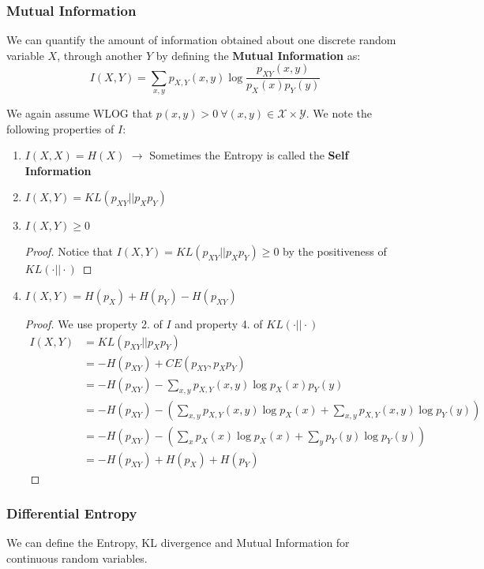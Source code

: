 \documentclass[]{article}
\theoremstyle{mattstyle}
\theoremstyle{definition}
\begin{document}
\subsubsection{Mutual Information}
We can quantify the amount of information obtained about one discrete random variable $X$, through another $Y$ by defining the \textbf{Mutual Information} as:
\begin{equation}
I(X,Y)=\sum_{x,y}p_{X,Y}(x,y)\log\frac{p_{XY}(x,y)}{p_X(x)p_Y(y)}
\end{equation}

We again assume WLOG that \(p(x,y)>0 \ \forall (x,y)\in\mathcal{X}\times\mathcal{Y}\). We note the following properties of $I$:

\begin{enumerate}
	\item \(I(X,X) = H(X)\) \(\rightarrow\) Sometimes the Entropy is called the \textbf{Self Information}
	\item $I(X,Y) = KL(p_{XY}||p_Xp_Y)$
	\item \(I(X,Y)\ge 0\)
	\begin{proof}
		Notice that \(I(X,Y) = KL(p_{XY}||p_Xp_Y) \ge 0\) by the positiveness of \(KL(\cdot||\cdot)\)
	\end{proof}
	\item $I(X,Y) = H(p_X) + H(p_Y) -H(p_{XY})$
	\begin{proof} We use property 2. of $I$ and property 4. of \(KL(\cdot||\cdot)\)
		\begin{align*}
		I(X,Y) &= KL(p_{XY}||p_Xp_Y) \\
		&= -H(p_{XY}) + CE(p_{XY},p_Xp_Y) \\
		&= -H(p_{XY}) - \sum_{x,y}p_{X,Y}(x,y)\log p_X(x)p_Y(y)\\
		&= -H(p_{XY}) - \left(\sum_{x,y}p_{X,Y}(x,y)\log p_X(x) + \sum_{x,y}p_{X,Y}(x,y)\log p_Y(y)\right)\\
		&=-H(p_{XY}) - \left(\sum_{x}p_{X}(x)\log p_X(x) + \sum_{y}p_{Y}(y)\log p_Y(y)\right)\\
		&= -H(p_{XY}) + H(p_X) + H(p_Y)
		\end{align*}
	\end{proof}
	
\end{enumerate}

\subsubsection{Differential Entropy}
We can define the Entropy, KL divergence and Mutual Information for continuous random variables.
\end{document}
